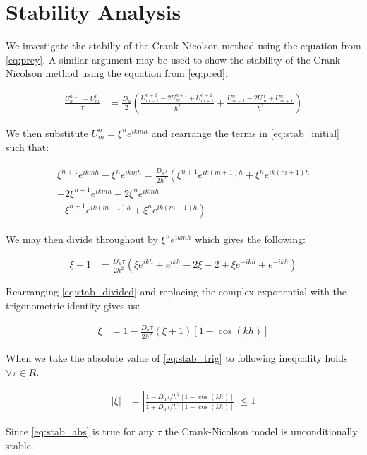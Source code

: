 \section{Stability Analysis}

We investigate the stabiliy of the Crank-Nicolson method using the equation
from \eqref{eq:prey}. A similar argument may be used to show the stability of
the Crank-Nicolson method using the equation from \eqref{eq:pred}.

\begin{align} \label{eq:stab_initial}
\frac{U_m^{n+1} - U_m^n}{\tau} &=
    \frac{D_u}{2} \left(
        \frac{U_{m-1}^{n+1} - 2 U_{m}^{n+1} + U_{m+1}^{n+1}}{h^2} +
        \frac{U_{m-1}^{n} - 2 U_{m}^{n} + U_{m+1}^{n}}{h^2}
    \right)
\end{align}

We then substitute $U_m^n = \xi^n e^{ikmh}$ and rearrange the terms in
\eqref{eq:stab_initial} such that:

\begin{align} \label{eq:stab_subbed}
\begin{split}
\xi^{n+1} e^{ikmh} - \xi^{n} e^{ikmh} =
    \frac{D_u \tau}{2h^2} \left(
        \xi^{n+1} e^{ik(m+1)h} + \xi^{n} e^{ik(m+1)h} \right. \\
        - 2 \xi^{n+1} e^{ikmh} - 2 \xi^{n} e^{ikmh} \\
        \left. + \xi^{n+1} e^{ik(m-1)h} + \xi^{n} e^{ik(m-1)h} \right)
\end{split}
\end{align}

We may then divide throughout by $\xi^{n} e^{ikmh}$ which gives the following:

\begin{align} \label{eq:stab_divided}
\xi - 1 &= \frac{D_u \tau}{2h^2} \left(
    \xi e^{ikh} + e^{ikh} - 2 \xi - 2 + \xi e^{-ikh} + e^{-ikh}
    \right)
\end{align}

Rearranging \eqref{eq:stab_divided} and replacing the complex exponential with
the trigonometric identity gives us:

\begin{align} \label{eq:stab_trig}
\xi &= 1  - \frac{D_u \tau}{2h^2} (\xi + 1) [1 - \cos(kh)]
\end{align}

When we take the absolute value of \eqref{eq:stab_trig} to following inequality
holds $\forall \tau \in R$.

\begin{align} \label{eq:stab_abs}
| \xi | &= \left|
    \frac{1 - D_u \tau / h^2 [1 - \cos(kh)]}
         {1 + D_u \tau / h^2 [1 - \cos(kh)]}
    \right| \leq 1
\end{align}

Since \eqref{eq:stab_abs} is true for any $\tau$ the Crank-Nicolson model is
unconditionally stable.
